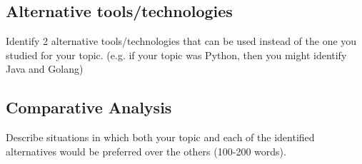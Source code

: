 \documentclass[a4paper, 11pt]{report}
\begin{document}
\subsection{Alternative tools/technologies}
Identify 2 alternative tools/technologies that can be used instead of the one you studied for your topic. (e.g. if your topic was Python, then you might identify Java and Golang)
\subsection{Comparative Analysis}
Describe situations in which both your topic and each of the identified alternatives would be preferred over the others (100-200 words).




\newpage
\end{document}
